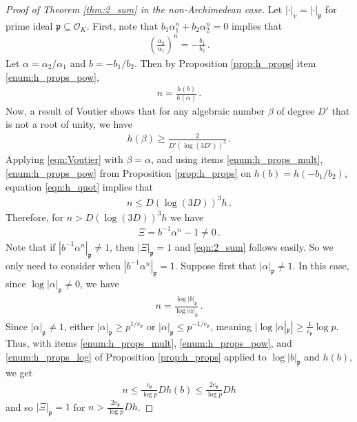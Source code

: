 \documentclass{article}\usepackage[a4paper,margin=20mm]{geometry}
\newcommand{\p}{\mathfrak{p}}
\renewcommand{\O}{\mathcal{O}}
\begin{document}
\begin{proof}[Proof of Theorem \ref{thm:2_sum} in the non-Archimedean case]
Let $|\cdot|_v = |\cdot|_\p$ for prime ideal $\p \subseteq \O_K$. First, note that $b_1 \alpha_1^n + b_2 \alpha_2^n = 0$ implies that
\begin{align*}
\left( \frac{\alpha_2}{\alpha_1} \right)^n = -\frac{b_1}{b_2} \, .
\end{align*}
Let $\alpha = \alpha_2/\alpha_1$ and $b = -b_1/b_2$. Then by Proposition \ref{prop:h_props} item \ref{enum:h_props_pow},
\begin{align} \label{eqn:h_quot}
n = \frac{h( b )}{h ( \alpha )} \, .
\end{align}
Now, a result of Voutier \cite[Corollary 2]{PaulVoutier1996} shows that for any algebraic number $\beta$ of degree $D'$ that is not a root of unity, we have
\begin{align} \label{eqn:Voutier}
h(\beta) \geq \frac{2}{D'(\log(3D'))^3} \, .
\end{align}
Applying \eqref{eqn:Voutier} with $\beta = \alpha$, and using items \ref{enum:h_props_mult}, \ref{enum:h_props_pow} from Proposition \ref{prop:h_props} on $h(b) = h(-b_1/b_2)$, equation \eqref{eqn:h_quot} implies that
\begin{align*}
    n \leq D(\log(3D))^3h \, .
\end{align*}
Therefore, for $n > D(\log(3D))^3h$ we have
\begin{align*}
\Xi =  b^{-1}\alpha^n - 1 \neq 0 \, .
\end{align*}
Note that if $\left| b^{-1}\alpha^n \right|_\p \neq 1$, then $|\Xi|_\p = 1$ and \eqref{eqn:2_sum} follows easily. So we only need to consider when $\left|b^{-1}\alpha^n \right|_\p = 1$. Suppose first that $\left|\alpha \right|_\p \neq 1$. In this case, since $\log |\alpha|_\p \neq 0$, we have 
\begin{align*}
    n = \frac{\log \left| b \right|_\p}{\log |\alpha|_\p} \, .
\end{align*}
Since $|\alpha|_\p \neq 1$, either $|\alpha|_\p \geq p^{1/e_{\p}}$ or $|\alpha|_\p \leq p^{-1/e_{\p}}$, meaning $|\log |\alpha|_\p| \geq \frac{1}{e_{\p}} \log p$. Thus, with items \ref{enum:h_props_mult}, \ref{enum:h_props_pow}, and \ref{enum:h_props_log} of Proposition \ref{prop:h_props} applied to $\log|b|_\p$ and $h(b)$, we get
\begin{align*}
    n \leq \frac{e_{\p}}{\log p}D h(b) \leq \frac{2e_{\p}}{\log p} D h 
\end{align*}
and so $|\Xi|_\p = 1$ for $n > \frac{2e_{\p}}{\log p} D h $.


\end{proof}
\end{document}
